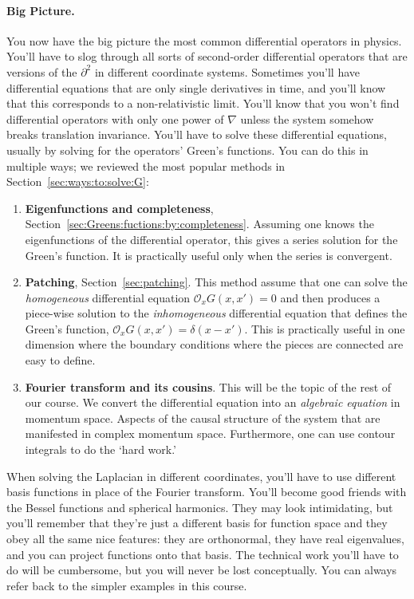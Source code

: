 \paragraph{Big Picture.}
You now have the big picture the most common differential operators in physics. You'll have to slog through all sorts of second-order differential operators that are versions of the $\partial^2$ in different coordinate systems. Sometimes you'll have differential equations that are only single derivatives in time, and you'll know that this corresponds to a non-relativistic limit. You'll know that you won't find differential operators with only one power of $\nabla$ unless the system somehow breaks translation invariance. You'll have to solve these differential equations, usually by solving for the operators' Green's functions. You can do this in multiple ways; we reviewed the most popular methods in Section~\ref{sec:ways:to:solve:G}:
\begin{enumerate}

\item \textbf{Eigenfunctions and completeness}, Section~\ref{sec:Greens:fuctions:by:completeness}. Assuming one knows the eigenfunctions of the differential operator, this gives a series solution for the Green's function. It is practically useful only when the series is convergent.

\item \textbf{Patching}, Section~\ref{sec:patching}. This method assume that one can solve the \emph{homogeneous} differential equation $\mathcal O_x G(x,x')=0$ and then produces a piece-wise solution to the \emph{inhomogeneous} differential equation that defines the Green's function, $\mathcal O_x G(x,x')=\delta(x-x')$. This is practically useful in one dimension where the boundary conditions where the pieces are connected are easy to define.

\item \textbf{Fourier transform and its cousins}. This will be the topic of the rest of our course. We convert the differential equation into an \emph{algebraic equation} in momentum space. Aspects of the causal structure of the system that are manifested in complex momentum space. Furthermore, one can use contour integrals to do the `hard work.'
\end{enumerate}
When solving the Laplacian in different coordinates, you'll have to use different basis functions in place of the Fourier transform. You'll become good friends with the Bessel functions and spherical harmonics. They may look intimidating, but you'll remember that they're just a different basis for function space and they obey all the same nice features: they are orthonormal, they have real eigenvalues, and you can project functions onto that basis. The technical work you'll have to do will be cumbersome, but you will never be lost conceptually. You can always refer back to the simpler examples in this course.

